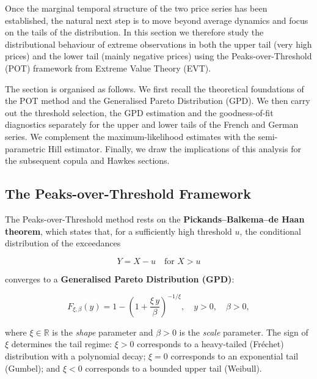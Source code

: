 Once the marginal temporal structure of the two price series has been established, the
natural next step is to move beyond average dynamics and focus on the tails of the
distribution. In this section we therefore study the distributional behaviour of extreme
observations in both the upper tail (very high prices) and the lower tail (mainly negative
prices) using the Peaks-over-Threshold (POT) framework from Extreme Value Theory (EVT).

The section is organised as follows. We first recall the theoretical foundations of the
POT method and the Generalised Pareto Distribution (GPD). We then carry out the threshold
selection, the GPD estimation and the goodness-of-fit diagnostics separately for the upper
and lower tails of the French and German series. We complement the maximum-likelihood
estimates with the semi-parametric Hill estimator. Finally, we draw the implications of this analysis for the subsequent
copula and Hawkes sections.

\subsection{The Peaks-over-Threshold Framework}
\label{subsec:pot_theory}

The Peaks-over-Threshold method rests on the
\textbf{Pickands–Balkema–de Haan theorem}, which states that, for a sufficiently high
threshold $u$, the conditional distribution of the exceedances

\begin{equation}
    Y = X - u \quad \text{for } X > u
    \label{eq:upper_excess}
\end{equation}

converges to a \textbf{Generalised Pareto Distribution (GPD)}:

\begin{equation}
    F_{\xi,\beta}(y) = 1 - \left(1 + \frac{\xi\, y}{\beta}\right)^{-1/\xi},
    \quad y > 0, \quad \beta > 0,
    \label{eq:gpd_upper}
\end{equation}

where $\xi \in \mathbb{R}$ is the \emph{shape} parameter and $\beta > 0$ is the
\emph{scale} parameter. The sign of $\xi$ determines the tail regime:
$\xi > 0$ corresponds to a heavy-tailed (Fréchet) distribution with a polynomial
decay; $\xi = 0$ corresponds to an exponential tail (Gumbel); and $\xi < 0$
corresponds to a bounded upper tail (Weibull).

